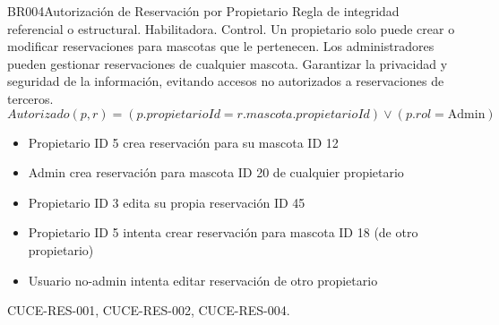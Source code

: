 \begin{BussinesRule}{BR004}{Autorización de Reservación por Propietario}
	\BRitem[Tipo:] Regla de integridad referencial o estructural.
	\BRitem[Clase:] Habilitadora.
	\BRitem[Nivel:] Control.
	\BRitem[Descripción:] Un propietario solo puede crear o modificar reservaciones para mascotas que le pertenecen. Los administradores pueden gestionar reservaciones de cualquier mascota.
	\BRitem[Motivación:] Garantizar la privacidad y seguridad de la información, evitando accesos no autorizados a reservaciones de terceros.
	\BRitem[Sentencia:] 
		\begin{displaymath}
			Autorizado(p, r) = (p.propietarioId = r.mascota.propietarioId) \lor (p.rol = \textrm{Admin})
		\end{displaymath}
		\begin{itemize}
			\item Propietario ID 5 crea reservación para su mascota ID 12
			\item Admin crea reservación para mascota ID 20 de cualquier propietario
			\item Propietario ID 3 edita su propia reservación ID 45
		\end{itemize}
		\begin{itemize}
			\item Propietario ID 5 intenta crear reservación para mascota ID 18 (de otro propietario)
			\item Usuario no-admin intenta editar reservación de otro propietario
		\end{itemize}
	 CUCE-RES-001, CUCE-RES-002, CUCE-RES-004.
\end{BussinesRule}


